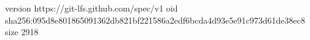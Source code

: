 version https://git-lfs.github.com/spec/v1
oid sha256:095d8e801865091362db821bf221586a2edf6bcda4d93e5e91c973d61de38ec8
size 2918
